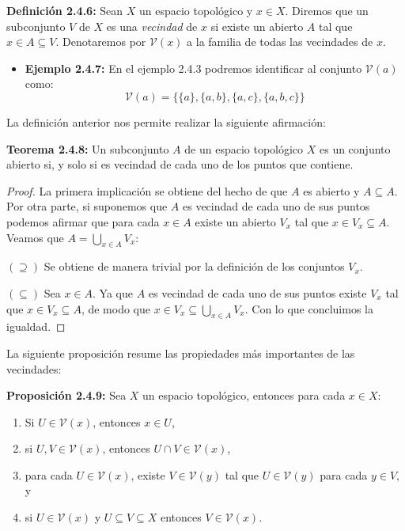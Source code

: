 \textbf{Definición 2.4.6:} Sean $X$ un espacio topológico y $x\in X$. Diremos que un subconjunto $V$ de $X$ es una \textit{vecindad} de $x$ si existe un abierto $A$ tal que $x\in A\subseteq V$. Denotaremos por $\mathcal{V}(x)$ a la familia de todas las vecindades de $x$.

\begin{itemize}
    \item \textbf{Ejemplo 2.4.7:} En el ejemplo 2.4.3 podremos identificar al conjunto $\mathcal{V}(a)$ como:
    $$\mathcal{V}(a)=\{\{a\},\{a,b\},\{a,c\},\{a,b,c\}\}$$
\end{itemize}

La definición anterior nos permite realizar la siguiente afirmación:

\textbf{Teorema 2.4.8:} Un subconjunto $A$ de un espacio topológico $X$ es un conjunto abierto si, y solo si es vecindad de cada uno de los puntos que contiene.

\begin{proof}
La primera implicación se obtiene del hecho de que $A$ es abierto y $A\subseteq A$. Por otra parte, si suponemos que $A$ es vecindad de cada uno de sus puntos podemos afirmar que para cada $x\in A$ existe un abierto $V_x$ tal que $x\in V_x\subseteq A$. Veamos que $A=\bigcup_{x\in A}V_x$:

$(\supseteq)$ Se obtiene de manera trivial por la definición de los conjuntos $V_x$.

$(\subseteq)$ Sea $x\in A$. Ya que $A$ es vecindad de cada uno de sus puntos existe $V_x$ tal que $x\in V_x\subseteq A$, de modo que $x\in V_x\subseteq\bigcup_{x\in A}V_x$. Con lo que concluimos la igualdad.
\end{proof}

La siguiente proposición resume las propiedades más importantes de las vecindades:

\textbf{Proposición 2.4.9:} Sea $X$ un espacio topológico, entonces para cada $x\in X$:
\begin{enumerate}
    \item Si $U\in\mathcal{V}(x)$, entonces $x\in U$,
    \item si $U,V\in\mathcal{V}(x)$, entonces $U\cap V\in\mathcal{V}(x)$,
    \item para cada $U\in\mathcal{V}(x)$, existe $V\in\mathcal{V}(y)$ tal que $U\in\mathcal{V}(y)$ para cada $y\in V$, y 
    \item si $U\in\mathcal{V}(x)$ y $U\subseteq V\subseteq X$ entonces $V\in\mathcal{V}(x)$.
\end{enumerate}

